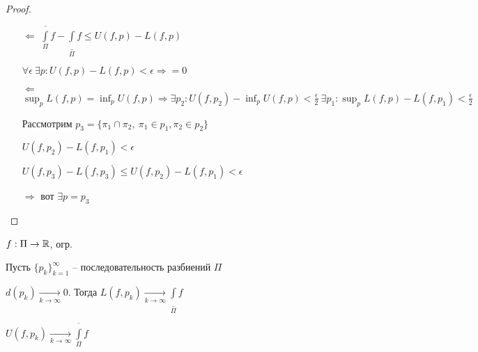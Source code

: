     \begin{proof}
        $ $
        \begin{enumerate}
            \item[$\boxed{\Leftarrow}$] $\underset{\Pi}{\overline{\int}} f - \underset{\Pi}{\underline{\int}} f \le U(f, p) - L(f, p)$
                \par $\forall \epsilon \ \exists p : U(f, p) - L(f, p) < \epsilon \Rightarrow = 0$
            \item[$\boxed{\Leftarrow}$] $\sup_p L(f, p) = \inf_p U(f, p) \Rightarrow \exists p_2 : U(f, p_2) - \inf_p U(f, p) < \frac \epsilon 2 \ \exists p_1 : \sup_p L(f, p) - L(f, p_1) < \frac \epsilon 2$
                \par Рассмотрим $p_3 = \{\pi_1 \cap \pi_2, \ \pi_1 \in p_1, \pi_2 \in p_2\}$
                \par $U(f, p_2) - L(f, p_1) < \epsilon$
                \par $U(f, p_3) - L(f, p_3) \le U(f, p_2) - L(f, p_1) < \epsilon$ %
                \par $\Rightarrow$ вот $\exists p = p_3$
        \end{enumerate}
    \end{proof}

    \begin{lemma}
        $f : \Pi \rightarrow \mathbb{R}$, огр.
        \par Пусть $\{p_k\}_{k=1}^\infty$ -- последовательность разбиений $\Pi$
        \par $d(p_k) \xrightarrow[k \rightarrow \infty]{} 0$. Тогда $L(f, p_k) \xrightarrow[k \rightarrow \infty]{} \underset{\Pi}{\underline{\int}} f$
        \par $U(f, p_k) \xrightarrow[k \rightarrow \infty]{} \underset{\Pi}{\overline{\int}} f$
    \end{lemma}

